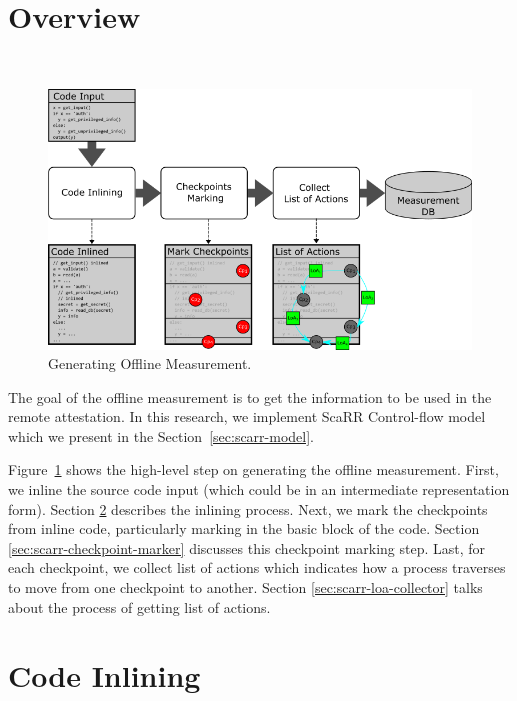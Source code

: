 \section{Overview}\
\label{sec:overview}

\begin{figure}[t]
    \centerline{\includegraphics[scale=.70]{Figures/04/scarr-overview.png}}
    \caption{Generating Offline Measurement.}
    \label{fig:scarr-overview}
\end{figure}

The goal of the offline measurement is to get the information to be used in the
remote attestation. In this research, we implement ScaRR Control-flow
model~\cite{toffaliniScaRRScalableRuntime2019} which we present in the
Section~\ref{sec:scarr-model}. 

Figure~\ref{fig:scarr-overview} shows the high-level step on generating the
offline measurement. First, we inline the source code input (which could be in
an intermediate representation form). Section \ref{sec:code-inlining} describes
the inlining process. Next, we mark the checkpoints from inline code,
particularly marking in the basic block of the code. Section
\ref{sec:scarr-checkpoint-marker} discusses this checkpoint marking step. Last,
for each checkpoint, we collect list of actions which indicates how a process
traverses to move from one checkpoint to another. Section
\ref{sec:scarr-loa-collector} talks about the process of getting list of
actions.

\section{Code Inlining}
\label{sec:code-inlining}


